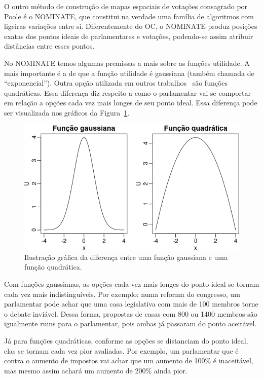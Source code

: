 \documentclass[a4paper, 12pt]{article}
\newcommand\nominate{NOMINATE\xspace}
\begin{document}
O outro método de construção de mapas espaciais de votações consagrado por Poole é o \nominate, que constitui na verdade uma família de algoritmos com ligeiras variações entre si. Diferentemente do OC, o \nominate produz posições exatas dos pontos ideais de parlamentares e votações, podendo-se assim atribuir distâncias entre esses pontos. 

No \nominate temos algumas premissas a mais sobre as funções utilidade. A mais importante é a de que a função utilidade é gaussiana (também chamada de ``exponencial''). Outra opção utilizada em outros trabalhos~\cite{clinton2004ideal} são funções quadráticas. Essa diferença diz respeito a como o parlamentar vai se comportar em relação a opções cada vez mais longes de seu ponto ideal. Essa diferença pode ser visualizada nos gráficos da Figura~\ref{fig:gaussiana_quadratica}. 

\begin{figure}[h!]
  \centering
  \includegraphics[scale=0.6]{figs/gaussiana_quadratica.png}
  \caption{Ilustração gráfica da diferença entre uma função gaussiana e uma função quadrática.}
  \label{fig:gaussiana_quadratica}
\end{figure}

Com funções gaussianas, as opções cada vez mais longes do ponto ideal se tornam cada vez mais indistinguíveis. Por exemplo: numa reforma do congresso, um parlamentar pode achar que uma casa legislativa com mais de 100 membros torne o debate inviável. Dessa forma, propostas de casas com 800 ou 1400 membros são igualmente ruins para o parlamentar, pois ambas já passaram do ponto aceitável.

Já para funções quadráticas, conforme as opções se distanciam do ponto ideal, elas se tornam cada vez pior avaliadas. Por exemplo, um parlamentar que é contra o aumento de impostos vai achar que um aumento de 100\% é inaceitável, mas mesmo assim achará um aumento de 200\% ainda pior.
\end{document}
